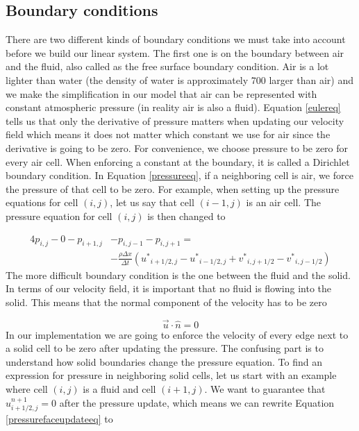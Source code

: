 \subsection{Boundary conditions}

There are two different kinds of boundary conditions we must take into account before we build our linear system. The first one is on the boundary between air and the fluid, also called as the free surface boundary condition. Air is a lot lighter than water (the density of water is approximately 700 larger than air) and we make the simplification in our model that air can be represented with constant atmospheric pressure (in reality air is also a fluid). Equation \ref{eulereq} tells us that only the derivative of pressure matters when updating our velocity field which means it does not matter which constant we use for air since the derivative is going to be zero. For convenience, we choose pressure to be zero for every air cell. When enforcing a constant at the boundary, it is called a Dirichlet boundary condition. In Equation \ref{pressureeq}, if a neighboring cell is air, we force the pressure of that cell to be zero. For example, when setting up the pressure equations for cell $(i,j)$, let us say that cell $(i-1, j)$ is an air cell. The pressure equation for cell $(i,j)$ is then changed to

\begin{equation}
\begin{split}
4p_{i,j} - 0 - p_{i+1,j} & - p_{i,j-1} - p_{i,j+1} = \\ &-\frac{\rho \Delta x}{\Delta t}({u^*}_{i+1/2,j} - {u^*}_{i-1/2,j} + {v^*}_{i,j+1/2} - {v^*}_{i,j-1/2})
\end{split}
\label{dirichleteq}
\end{equation}
\noindent
The more difficult boundary condition is the one between the fluid and the solid. In terms of our velocity field, it is important that no fluid is flowing into the solid. This means that the normal component of the velocity has to be zero

\begin{equation}
\vec{u} \cdot \hat{n} = 0
\end{equation}
\noindent
In our implementation we are going to enforce the velocity of every edge next to a solid cell to be zero after updating the pressure. The confusing part is to understand how solid boundaries change the pressure equation. To find an expression for pressure in neighboring solid cells, let us start with an example where cell $(i,j)$ is a fluid and cell $(i+1,j)$. We want to guarantee that $u^{n+1}_{i+1/2,j} = 0$ after the pressure update, which means we can rewrite Equation \ref{pressurefaceupdateeq} to


